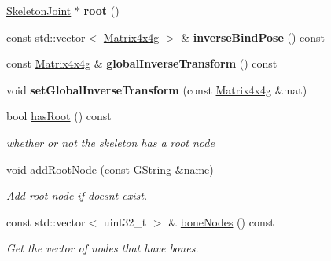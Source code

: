 \begin{Indent}
\begin{DoxyCompactItemize}
\mbox{\hyperlink{classrev_1_1_skeleton_joint}{Skeleton\+Joint}} $\ast$ {\bfseries root} ()
\item 
\mbox{\label{classrev_1_1_skeleton_a8d718e857c60cf725444f95f28ab3358}} 
const std\+::vector$<$ \mbox{\hyperlink{classrev_1_1_square_matrix}{Matrix4x4g}} $>$ \& {\bfseries inverse\+Bind\+Pose} () const
\item 
\mbox{\label{classrev_1_1_skeleton_a4233e58d0d75de4817a38a4725309f02}} 
const \mbox{\hyperlink{classrev_1_1_square_matrix}{Matrix4x4g}} \& {\bfseries global\+Inverse\+Transform} () const
\item 
\mbox{\label{classrev_1_1_skeleton_a5bb31ff52109b274c4a04acc43ff70d4}} 
void {\bfseries set\+Global\+Inverse\+Transform} (const \mbox{\hyperlink{classrev_1_1_square_matrix}{Matrix4x4g}} \&mat)
\item 
\mbox{\label{classrev_1_1_skeleton_ad1768b810c81af585fb6ff6e773c8f39}} 
bool \mbox{\hyperlink{classrev_1_1_skeleton_ad1768b810c81af585fb6ff6e773c8f39}{has\+Root}} () const
\begin{DoxyCompactList}\small\item\em whether or not the skeleton has a root node \end{DoxyCompactList}\item 
\mbox{\label{classrev_1_1_skeleton_aa1b1ed888cd08d47497998070a1b4d92}} 
void \mbox{\hyperlink{classrev_1_1_skeleton_aa1b1ed888cd08d47497998070a1b4d92}{add\+Root\+Node}} (const \mbox{\hyperlink{classrev_1_1_g_string}{G\+String}} \&name)
\begin{DoxyCompactList}\small\item\em Add root node if doesn\textquotesingle{}t exist. \end{DoxyCompactList}\item 
\mbox{\label{classrev_1_1_skeleton_ae59814a9c7beb63c0ca2598497eddb34}} 
const std\+::vector$<$ uint32\+\_\+t $>$ \& \mbox{\hyperlink{classrev_1_1_skeleton_ae59814a9c7beb63c0ca2598497eddb34}{bone\+Nodes}} () const
\begin{DoxyCompactList}\small\item\em Get the vector of nodes that have bones. \end{DoxyCompactList}\item 

\end{DoxyCompactItemize}
\end{Indent}
